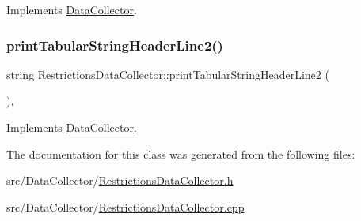 Implements \mbox{\hyperlink{classDataCollector_a91619cfa9e9b8cefd2f7c20d5718b41e}{Data\+Collector}}.

\mbox{\label{classRestrictionsDataCollector_afb3c49c2c9b152bb2372e2fcc198e1b8}} 
\subsubsection{\texorpdfstring{print\+Tabular\+String\+Header\+Line2()}{printTabularStringHeaderLine2()}}
{\footnotesize\ttfamily string Restrictions\+Data\+Collector\+::print\+Tabular\+String\+Header\+Line2 (\begin{DoxyParamCaption}{ }\end{DoxyParamCaption})\hspace{0.3cm}{\ttfamily [override]}, {\ttfamily [virtual]}}



Implements \mbox{\hyperlink{classDataCollector_af01ea961314be2164f39e6d4cd59e443}{Data\+Collector}}.



The documentation for this class was generated from the following files\+:\begin{DoxyCompactItemize}
\item 
src/\+Data\+Collector/\mbox{\hyperlink{RestrictionsDataCollector_8h}{Restrictions\+Data\+Collector.\+h}}\item 
src/\+Data\+Collector/\mbox{\hyperlink{RestrictionsDataCollector_8cpp}{Restrictions\+Data\+Collector.\+cpp}}\end{DoxyCompactItemize}

